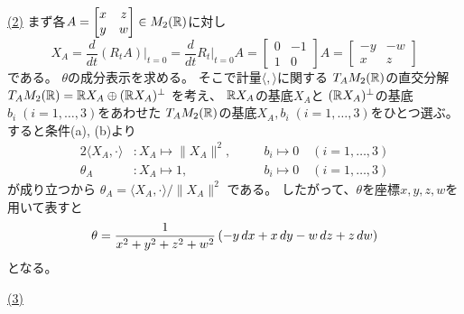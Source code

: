 \documentclass[report]{jlreq}
\begin{document}
\begin{answer}
    \uline{(2)} \quad
    まず各$A = \begin{bmatrix}
        x & z \\
        y & w
    \end{bmatrix} \in M_2(\mathbb{R})$に対し
    \begin{equation}
        X_A
            = \frac{d}{dt}(R_tA) \Bigg|_{t=0}
            = \frac{d}{dt}R_t \Bigg|_{t=0} A
            = \begin{bmatrix}
                0 & -1 \\
                1 & 0
            \end{bmatrix} A
            = \begin{bmatrix}
                -y & -w \\
                x & z
            \end{bmatrix}
    \end{equation}
    である。
    $\theta$の成分表示を求める。
    そこで計量$\langle,\rangle$に関する
    $T_AM_2(\mathbb{R})$の直交分解
    $T_AM_2(\mathbb{R}) = \mathbb{R} X_A \oplus (\mathbb{R} X_A)^{\perp}$
    を考え、
    $\mathbb{R} X_A$の基底$X_A$と
    $(\mathbb{R} X_A)^{\perp}$の基底$b_i \; (i = 1, \dots, 3)$をあわせた
    $T_AM_2(\mathbb{R})$の基底$X_A, b_i \; (i = 1, \dots, 3)$をひとつ選ぶ。
    すると条件(a), (b)より
    \begin{alignat}{2}
        \langle X_A, \cdot \rangle &\colon
            X_A \mapsto \| X_A \|^2,
            \quad
            &&b_i \mapsto 0 \quad (i = 1, \dots, 3) \\
        \theta_A &\colon
            X_A \mapsto 1,
            \quad
            &&b_i \mapsto 0 \quad (i = 1, \dots, 3)
    \end{alignat}
    が成り立つから
    $\theta_A = \langle X_A, \cdot \rangle / \| X_A \|^2$
    である。
    したがって、$\theta$を座標$x, y, z, w$を用いて表すと
    \begin{equation}
        \theta
            = \frac{1}{x^2 + y^2 + z^2 + w^2}
                \left({
                    -y \, dx + x \, dy - w \, dz + z \, dw
                }\right)
    \end{equation}
    となる。

    \uline{(3)} \quad
\end{answer}
\end{document}
